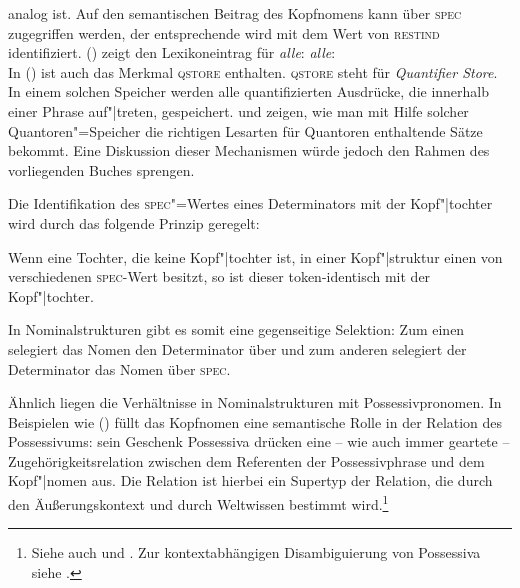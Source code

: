 analog ist. Auf den semantischen Beitrag des Kopfnomens kann über \textsc{spec} zugegriffen werden,
der entsprechende \contw wird mit dem Wert von \textsc{restind} identifiziert. ()
zeigt den Lexikoneintrag für \emph{alle}:
\eas
\emph{alle}:\\
\zs
In () ist auch das Merkmal \textsc{qstore} enthalten. \textsc{qstore} steht für \emph{Quantifier Store}.
In einem solchen Speicher werden alle quantifizierten Ausdrücke, die innerhalb einer Phrase auf"|treten,
gespeichert. \citet[Kapitel~8]{ps2} und \citet{PY98a-u} zeigen, wie man mit
Hilfe solcher Quantoren"=Speicher die richtigen Lesarten für Quantoren enthaltende Sätze
bekommt. Eine Diskussion dieser Mechanismen würde jedoch den Rahmen des vorliegenden Buches
sprengen.%


Die Identifikation des \textsc{spec}"=Wertes eines Determinators mit der Kopf"|tochter
wird durch das folgende Prinzip geregelt:
\begin{prinzip-break} 
\label{prinzip-spec}
Wenn eine Tochter, die keine Kopf"|tochter ist, in einer Kopf"|struktur
einen von  verschiedenen \textsc{spec}-Wert besitzt, so ist dieser token-identisch mit
der Kopf"|tochter.
\end{prinzip-break}
In Nominalstrukturen gibt es somit eine gegenseitige Selektion: Zum einen selegiert das
Nomen den Determinator über \subcat und zum anderen selegiert der Determinator das Nomen
über \textsc{spec}.

Ähnlich liegen die Verhältnisse in Nominalstrukturen mit Possessivpronomen.
In Beispielen wie () füllt das Kopfnomen eine semantische Rolle in der Relation des Possessivums:
\ea
sein Geschenk
\z
Possessiva drücken eine -- wie auch immer geartete -- Zugehörigkeitsrelation
zwischen dem Referenten der Possessivphrase und dem Kopf"|nomen
aus. Die Relation  ist hierbei ein Supertyp
der Relation, die durch den Äußerungskontext und durch Weltwissen 
bestimmt wird.\footnote{
        Siehe auch  und .           %
        Zur kontextabhängigen Disambiguierung von Possessiva siehe
        .
}
 
